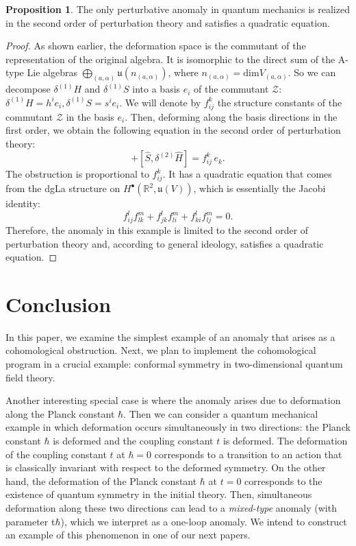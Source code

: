 \documentclass[10pt,a4paper]{amsart}
\theoremstyle{definition}
\newtheorem{proposition}[remark]{Proposition}
\begin{document}
\begin{proposition}
    The only perturbative anomaly in quantum mechanics is realized in the second order of perturbation theory and satisfies a quadratic equation.
    \begin{proof}
        As shown earlier, the deformation space is the commutant of the representation of the original algebra. It is isomorphic to the direct sum of the A-type Lie algebras $\bigoplus_{(a,\alpha)}\mathfrak{u}(n_{(a,\alpha)})$, where $n_{(a,\alpha)}=\mathrm{dim}V_{(a,\alpha)}$. So we can decompose $\delta^{(1)} H$ and $\delta^{(1)} S$ into a basis $e_{i}$ of the commutant $\mathcal{Z}$: $\delta^{(1)} H=h^{i}e_{i}, \delta^{(1)} S=s^{i}e_{i}$. We will denote by $f_{ij}^{k}$ the structure constants of the commutant $\mathcal{Z}$ in the basis $e_{i}$. Then, deforming along the basis directions in the first order, we obtain the following equation in the second order of perturbation theory:
        \begin{equation}
            [\delta^{(2)}\hat{S},\hat{H}]+[\hat{S},\delta^{(2)}\hat{H}]=f_{ij}^{k}\,e_{k}.
        \end{equation}
        The obstruction is proportional to $f_{ij}^{k}$. It has a quadratic equation that comes from the dgLa structure on $H^{\bullet}(\mathbb{R}^{2},\mathfrak{u}(V))$, which is essentially the Jacobi identity:
        \begin{equation}
            f_{ij}^{l} f_{lk}^{m} + f_{jk}^{l} f_{li}^{m} + f_{ki}^{l} f_{lj}^{m} = 0.
        \end{equation}
        Therefore, the anomaly in this example is limited to the second order of perturbation theory and, according to general ideology, satisfies a quadratic equation.
     \end{proof}
\end{proposition}
\section{Conclusion}
In this paper, we examine the simplest example of an anomaly that arises as a cohomological obstruction. Next, we plan to implement the cohomological program in a crucial example: conformal symmetry in two-dimensional quantum field theory.

Another interesting special case is where the anomaly arises due to deformation along the Planck constant $\hbar$. Then we can consider a quantum mechanical example in which deformation occurs simultaneously in two directions: the Planck constant $\hbar$ is deformed and the coupling constant $t$ is deformed. The deformation of the coupling constant $t$ at $\hbar=0$ corresponds to a transition to an action that is classically invariant with respect to the deformed symmetry. On the other hand, the deformation of the Planck constant $\hbar$ at $t=0$ corresponds to the existence of quantum symmetry in the initial theory. Then, simultaneous deformation along these two directions can lead to a \emph{mixed-type} anomaly (with parameter t$\hbar $), which we interpret as a one-loop anomaly. We intend to construct an example of this phenomenon in one of our next papers.
\end{document}
